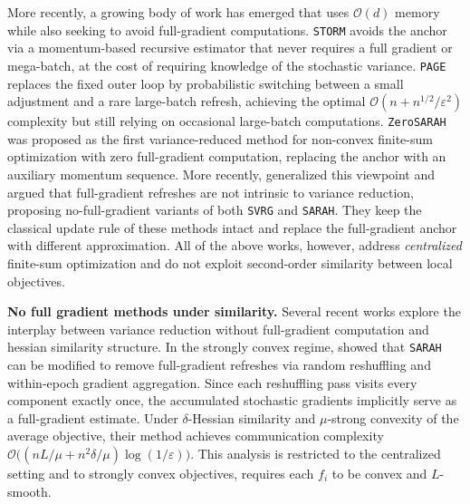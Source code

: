 \documentclass{article}
\begin{document}
More recently, a growing body of 
work has emerged that uses $\mathcal{O}(d)$ memory while also seeking to 
avoid full-gradient computations. \texttt{STORM} 
\cite{cutkosky2020momentumbasedvariancereductionnonconvex} avoids the anchor 
via a momentum-based recursive estimator that never requires a full gradient 
or mega-batch, at the cost of requiring knowledge of the stochastic variance. 
\texttt{PAGE} \cite{li2021page} replaces the fixed outer loop by probabilistic 
switching between a small adjustment and a rare large-batch refresh, achieving 
the optimal $\mathcal{O}(n + n^{1/2}/\varepsilon^2)$ complexity but still 
relying on occasional large-batch computations. 
\texttt{ZeroSARAH} \cite{li2021zerosarah} was proposed as the first 
variance-reduced method for non-convex finite-sum optimization with zero 
full-gradient computation, replacing the anchor with an auxiliary momentum 
sequence. More recently, \cite{medyakov2025variance} generalized this 
viewpoint and argued that full-gradient refreshes are not intrinsic to 
variance reduction, proposing no-full-gradient variants of 
both \texttt{SVRG} and \texttt{SARAH}. They keep the 
classical update rule of these methods intact and 
replace the full-gradient anchor with different  
approximation.  All of the above works, however, 
address \textit{centralized} finite-sum optimization and do not exploit 
second-order similarity between local objectives.

\textbf{No full gradient methods under similarity.} 
Several recent works explore the interplay between variance reduction without 
full-gradient computation and hessian similarity structure. In the strongly convex regime, 
\cite{beznosikov2024random} showed that  \texttt{SARAH} can be modified to remove full-gradient refreshes via random reshuffling and within-epoch gradient aggregation. Since each 
reshuffling pass visits every component exactly once, the accumulated 
stochastic gradients implicitly serve as a full-gradient estimate. Under 
$\delta$-Hessian similarity and $\mu$-strong convexity of the average 
objective, their method achieves communication complexity 
$\mathcal{O}\bigl((nL/\mu + n^{2}\delta/\mu)\log(1/\varepsilon)\bigr)$. 
This analysis is restricted to 
the centralized setting and to strongly convex objectives, requires each 
$f_i$ to be convex and $L$-smooth. 
\end{document}
